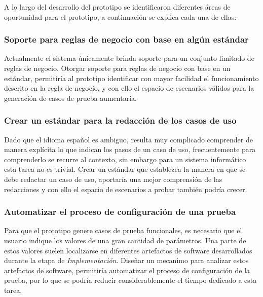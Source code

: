 A lo largo del desarrollo del prototipo se identificaron diferentes áreas de oportunidad para el prototipo, a continuación se explica cada una de ellas:

\subsubsection{Soporte para reglas de negocio con base en algún estándar} 
	Actualmente el sistema únicamente brinda soporte para un conjunto limitado de reglas de negocio. Otorgar soporte para reglas de negocio con base en un estándar, permitiría al prototipo identificar con mayor facilidad el funcionamiento descrito en la regla de negocio, y con ello el espacio de escenarios válidos para la generación de casos de prueba aumentaría.
	
\subsubsection{Crear un estándar para la redacción de los casos de uso}
	Dado que el idioma español es ambiguo, resulta muy complicado comprender de manera explícita lo que indican los pasos de un caso de uso, frecuentemente para comprenderlo se recurre al contexto, sin embargo para un sistema informático esta tarea no es trivial. Crear un estándar que establezca la manera en que se debe redactar un caso de uso, aportaría una mejor comprensión de las redacciones y con ello el espacio de escenarios a probar también podría crecer.	
	
\subsubsection{Automatizar el proceso de configuración de una prueba}
	Para que el prototipo genere casos de prueba funcionales, es necesario que el usuario indique los valores de una gran cantidad de parámetros. Una parte de estos valores suelen localizarse en diferentes artefactos de software desarrollados durante la etapa de {\it Implementación}. Diseñar un mecanimo para analizar estos artefactos de software, permitiría automatizar el proceso de configuración de la prueba, por lo que se podría reducir considerablemente el tiempo dedicado a esta tarea.